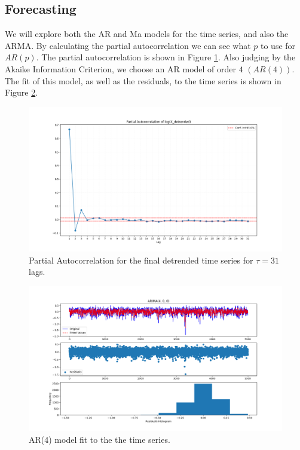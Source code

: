 \documentclass[conference]{IEEEtran}
\begin{document}
\subsection{Forecasting}

We will explore both the AR and Ma models for the time series, and also the ARMA. By calculating the partial autocorrelation we can see what $p$ to use for $AR(p)$. The partial autocorrelation is shown in Figure \ref{airfddtsg}. Also judging by the Akaike Information Criterion, we choose an AR model of order $4$ $(AR(4))$. The fit of this model, as well as the residuals, to the time series is shown in Figure \ref{ar4}.

\begin{figure}[ht]
    \centering
    \includegraphics[scale=0.2]{Figures/Partial Autocorrelation of log(X_detrended).png}
    \caption{Partial Autocorrelation for the final detrended time series for $\tau = 31$ lags.}
    \label{airfddtsg}
\end{figure}
\vspace{80mm}

\begin{figure}[ht]
    \centering
    \includegraphics[scale=0.2]{Figures/GlasnevinLin/ARIMA(4,0,0).png}
    \caption{AR(4) model fit to the the time series.}
    \label{ar4}
\end{figure}
\end{document}
